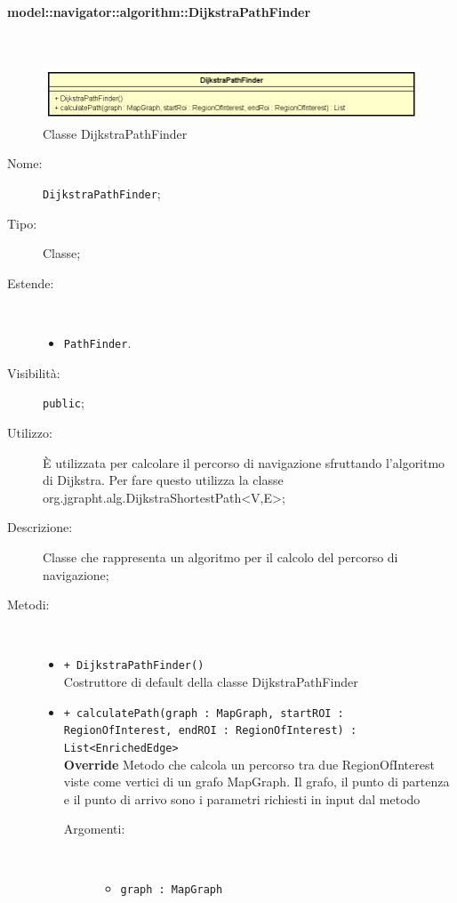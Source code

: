 \documentclass[../DefinizioneDiProdotto.tex]{subfiles}
\begin{document}
\paragraph{model::navigator::algorithm::DijkstraPathFinder}
\
\begin{figure}[H]
	\centering
	\includegraphics[width=\maxwidth]{img/DijkstraPathFinder.png}
	\caption{Classe DijkstraPathFinder}\label{fig:model::navigator::algorithm::DijkstraPathFinder} 
\end{figure}
\begin{description}
	\item[Nome:] \texttt{DijkstraPathFinder};
	\item[Tipo:] Classe;
	\item[Estende:] \
	\begin{itemize}
		\item \texttt{PathFinder}.
	\end{itemize}
	\item[Visibilità:] \texttt{public};
	\item[Utilizzo:] È utilizzata per calcolare il percorso di navigazione sfruttando l'algoritmo di Dijkstra. Per fare questo utilizza la classe org.jgrapht.alg.DijkstraShortestPath<V,E>;
	\item[Descrizione:] Classe che rappresenta un algoritmo per il calcolo del percorso di navigazione;
	\item[Metodi:] \
	\begin{itemize}
		\item \texttt{+ DijkstraPathFinder()}\\
		Costruttore di default della classe DijkstraPathFinder
		\item \texttt{+ calculatePath(graph : MapGraph, startROI : RegionOfInterest, endROI : RegionOfInterest) : List<EnrichedEdge>}\\
		\textbf{Override} Metodo che calcola un percorso tra due RegionOfInterest viste come vertici di un grafo MapGraph. Il grafo, il punto di partenza e il punto di arrivo sono i parametri richiesti in input dal metodo
		\begin{description}
			\item[Argomenti:] \
			\begin{itemize}
				\item \texttt{graph : MapGraph}\\

\end{itemize}
\end{description}
\end{itemize}
\end{description}
\end{document}
